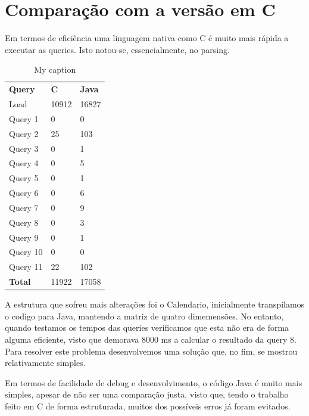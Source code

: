 \documentclass[10pt,a4paper]{report}
\begin{document}
\chapter{Comparação com a versão em C}
    Em termos de eficiência uma linguagem nativa como C é muito mais rápida a
    executar as queries. Isto notou-se, essencialmente, no parsing.
    \begin{table}[h]
        \centering
        \caption{My caption}
        \label{my-label}
        \begin{tabular}{lll}
        \textbf{Query}    & \textbf{C} & \textbf{Java}  \\
        Load              & 10912      & 16827 \\
        Query 1           & 0          & 0     \\
        Query 2           & 25         & 103   \\
        Query 3           & 0          & 1     \\
        Query 4           & 0          & 5     \\
        Query 5           & 0          & 1     \\
        Query 6           & 0          & 6     \\
        Query 7           & 0          & 9     \\
        Query 8           & 0          & 3     \\
        Query 9           & 0          & 1     \\
        Query 10          & 0          & 0     \\
        Query 11          & 22         & 102   \\
        \textbf{Total}    & 11922      & 17058
        \end{tabular}
    \end{table}

    A estrutura que sofreu mais alterações foi o Calendario, inicialmente
    transpilamos o codigo para Java, mantendo a matriz de quatro dimemensões.
    No entanto, quando testamos os tempos das queries verificamos que esta
    não era de forma alguma eficiente, visto que demorava 8000 ms a calcular
    o resultado da query 8. Para resolver este problema desenvolvemos uma
    solução que, no fim, se mostrou relativamente simples.

    Em termos de facilidade de debug e desenvolvimento, o código Java é muito
    mais simples, apesar de não ser uma comparação justa, visto que, tendo o
    trabalho feito em C de forma estruturada, muitos dos possíveis erros já
    foram evitados.
\end{document}
